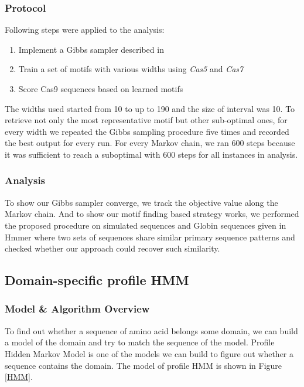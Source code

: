 \documentclass[11pt, oneside]{article}
\begin{document}
\subsubsection{Protocol}

Following steps were applied to the analysis:
\begin{enumerate}
	\item Implement a Gibbs sampler described in 
	\item Train a set of motifs with various widths using \textit{Cas5} and \textit{Cas7}
	\item Score Cas9 sequences based on learned motifs
\end{enumerate}
The widths used started from 10 to up to 190 and the size of interval was 10. To retrieve not only the most representative motif but other sub-optimal ones, for every width we repeated the Gibbs sampling procedure five times and recorded the best output for every run. For every Markov chain, we ran 600 steps because it was sufficient to reach a suboptimal with 600 steps for all instances in analysis.

\subsubsection{Analysis}
To show our Gibbs sampler converge, we track the objective value along the Markov chain. And to show our motif finding based strategy works, we performed the proposed procedure on simulated sequences and Globin sequences given in Hmmer\cite{hmmer} where two sets of sequences share similar primary sequence patterns and checked whether our approach could recover such similarity.

\subsection{Domain-specific profile HMM}

\subsubsection{Model \& Algorithm Overview}
To find out whether a sequence of amino acid belongs some domain, we can build a model of the domain and try to match the sequence of the model. Profile Hidden Markov Model is one of the 
models we can build to figure out whether a sequence contains the domain. The model of profile HMM is shown in Figure \ref{HMM}. 
\end{document}
